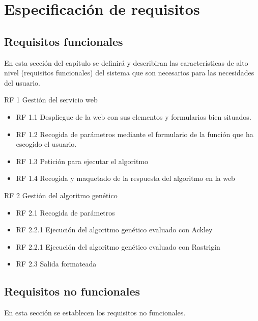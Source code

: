 \newpage
\section{Especificación de requisitos}

\subsection{Requisitos funcionales}

\bigskip
En esta sección del capítulo se definirá y describiran las características de alto nivel (requisitos funcionales) del sistema que son necesarios para las necesidades del usuario.

\bigskip
RF 1 Gestión del servicio web

\begin{itemize}
	\item RF 1.1 Despliegue de la web con sus elementos y formularios bien situados.
	
	\item RF 1.2 Recogida de parámetros mediante el formulario de la función que ha escogido el usuario.
	
	\item RF 1.3 Petición para ejecutar el algoritmo 
	
	\item RF 1.4 Recogida y maquetado de la respuesta del algoritmo en la web
\end{itemize}

RF 2 Gestión del algoritmo genético

\begin{itemize}
	\item RF 2.1 Recogida de parámetros
	
	\item RF 2.2.1 Ejecución del algoritmo genético evaluado con Ackley
	
	\item RF 2.2.1 Ejecución del algoritmo genético evaluado con Rastrigin
	
	\item RF 2.3 Salida formateada
\end{itemize}






\subsection{Requisitos no funcionales}

\bigskip
En esta sección se establecen los requisitos no funcionales.

